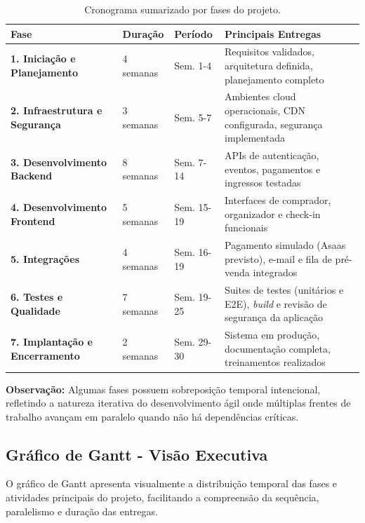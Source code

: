 \begin{table}[H]
\centering
\caption{Cronograma sumarizado por fases do projeto.}%
\label{tab:cronograma-fases}
\small
\begin{tabular}{|p{4cm}|p{2cm}|p{2.5cm}|p{5cm}|}
\hline
\textbf{Fase} & \textbf{Duração} & \textbf{Período} & \textbf{Principais Entregas} \\ \hline
\textbf{1. Iniciação e Planejamento} & 4 semanas & Sem. 1-4 & Requisitos validados, arquitetura definida, planejamento completo \\ \hline
\textbf{2. Infraestrutura e Segurança} & 3 semanas & Sem. 5-7 & Ambientes cloud operacionais, CDN configurada, segurança implementada \\ \hline
\textbf{3. Desenvolvimento Backend} & 8 semanas & Sem. 7-14 & APIs de autenticação, eventos, pagamentos e ingressos testadas \\ \hline
\textbf{4. Desenvolvimento Frontend} & 5 semanas & Sem. 15-19 & Interfaces de comprador, organizador e check-in funcionais \\ \hline
\textbf{5. Integrações} & 4 semanas & Sem. 16-19 & Pagamento simulado (Asaas previsto), e-mail e fila de pré-venda integrados \\ \hline
\textbf{6. Testes e Qualidade} & 7 semanas & Sem. 19-25 & Suites de testes (unitários e E2E), \textit{build} e revisão de segurança da aplicação \\ \hline
\textbf{7. Implantação e Encerramento} & 2 semanas & Sem. 29-30 & Sistema em produção, documentação completa, treinamentos realizados \\ \hline
\end{tabular}
\end{table}

\textbf{Observação:} Algumas fases possuem sobreposição temporal intencional, refletindo a natureza iterativa do desenvolvimento ágil onde múltiplas frentes de trabalho avançam em paralelo quando não há dependências críticas.

\subsection{Gráfico de Gantt - Visão Executiva}

O gráfico de Gantt apresenta visualmente a distribuição temporal das fases e atividades principais do projeto, facilitando a compreensão da sequência, paralelismo e duração das entregas.

